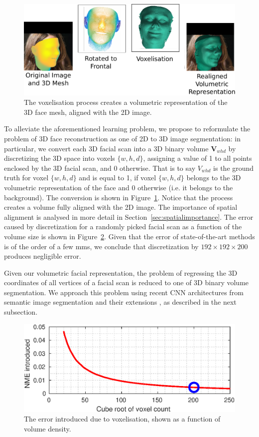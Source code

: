 \begin{figure}
  \centering
  \includegraphics[width=0.7\linewidth]{img/discretisation.pdf}
  \caption[Dataset voxelisation procedure]{The voxelisation process
    creates a volumetric representation of the 3D face mesh, aligned
    with the 2D image.}
  \label{fig:discretisation}
\end{figure}

To alleviate the aforementioned learning problem, we propose to
reformulate the problem of 3D face reconstruction as one of 2D to 3D
image segmentation: in particular, we convert each 3D facial scan into
a 3D binary volume $\mathbf{V}_{whd}$ by discretizing the 3D space
into voxels $\{w,h,d\}$, assigning a value of 1 to all points enclosed
by the 3D facial scan, and 0 otherwise. That is to say $ V_{whd}$ is
the ground truth for voxel $\{w,h,d\}$ and is equal to 1, if voxel
$\{w,h,d\}$ belongs to the 3D volumetric representation of the face
and 0 otherwise (i.e. it belongs to the background). The conversion is
shown in Figure~\ref{fig:discretisation}. Notice that the process
creates a volume fully aligned with the 2D image. The importance of
spatial alignment is analysed in more detail in
Section~\ref{sec:spatialimportance}. The error caused by
discretization for a randomly picked facial scan as a function of the
volume size is shown in Figure~\ref{fig:voxerror}. Given that the error
of state-of-the-art methods \cite{roth2016adaptive,liu2016joint} is of
the order of a few mms, we conclude that discretization by
$192\times 192\times 200$ produces negligible error.

Given our volumetric facial representation, the problem of regressing
the 3D coordinates of all vertices of a facial scan is reduced to one
of 3D binary volume segmentation. We approach this problem using
recent CNN architectures from semantic image segmentation
\cite{long2015fully} and their extensions \cite{newell2016stacked}, as
described in the next subsection.

\begin{figure}
  \centering
  \includegraphics[width=0.75\linewidth]{curves/voxerror.eps}
  \caption[Error due to voxelisation]{The error introduced due to
    voxelisation, shown as a function of volume density.}
  \label{fig:voxerror}
\end{figure}

